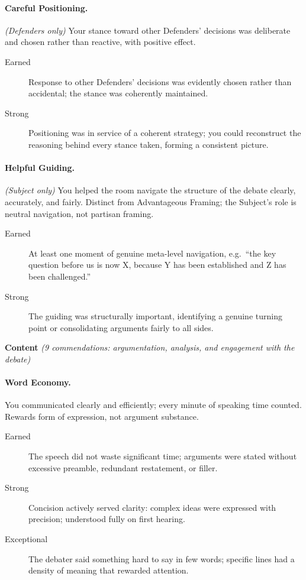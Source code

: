 \paragraph{Careful Positioning.} \textit{(Defenders only)} Your stance toward other Defenders' decisions was deliberate and chosen rather than reactive, with positive effect.
\begin{description}
    \item[Earned] Response to other Defenders' decisions was evidently chosen rather than accidental; the stance was coherently maintained.
    \item[Strong] Positioning was in service of a coherent strategy; you could reconstruct the reasoning behind every stance taken, forming a consistent picture.
\end{description}

\paragraph{Helpful Guiding.} \textit{(Subject only)} You helped the room navigate the structure of the debate clearly, accurately, and fairly. Distinct from Advantageous Framing; the Subject's role is neutral navigation, not partisan framing.
\begin{description}
    \item[Earned] At least one moment of genuine meta-level navigation, e.g.\ ``the key question before us is now X, because Y has been established and Z has been challenged.''
    \item[Strong] The guiding was structurally important, identifying a genuine turning point or consolidating arguments fairly to all sides.
\end{description}

\medskip
\noindent\textbf{Content} \textit{(9 commendations: argumentation, analysis, and engagement with the debate)}

\paragraph{Word Economy.} You communicated clearly and efficiently; every minute of speaking time counted. Rewards form of expression, not argument substance.
\begin{description}
    \item[Earned] The speech did not waste significant time; arguments were stated without excessive preamble, redundant restatement, or filler.
    \item[Strong] Concision actively served clarity: complex ideas were expressed with precision; understood fully on first hearing.
    \item[Exceptional] The debater said something hard to say in few words; specific lines had a density of meaning that rewarded attention.
\end{description}

